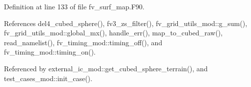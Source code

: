 Definition at line 133 of file fv\-\_\-surf\-\_\-map.\-F90.



References del4\-\_\-cubed\-\_\-sphere(), fv3\-\_\-zs\-\_\-filter(), fv\-\_\-grid\-\_\-utils\-\_\-mod\-::g\-\_\-sum(), fv\-\_\-grid\-\_\-utils\-\_\-mod\-::global\-\_\-mx(), handle\-\_\-err(), map\-\_\-to\-\_\-cubed\-\_\-raw(), read\-\_\-namelist(), fv\-\_\-timing\-\_\-mod\-::timing\-\_\-off(), and fv\-\_\-timing\-\_\-mod\-::timing\-\_\-on().



Referenced by external\-\_\-ic\-\_\-mod\-::get\-\_\-cubed\-\_\-sphere\-\_\-terrain(), and test\-\_\-cases\-\_\-mod\-::init\-\_\-case().

